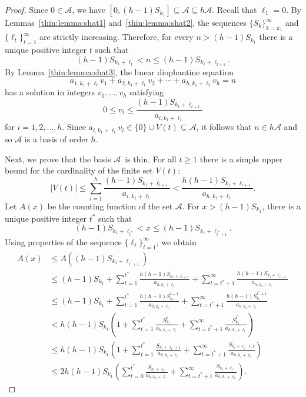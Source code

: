 \documentclass{amsart}
\begin{document}
\begin{proof}
Since $0 \in {\ensuremath{ \mathcal A}}$, we have $[0,(h-1)S_{k_1}] \subseteq {\ensuremath{ \mathcal A}} \subseteq h{\ensuremath{ \mathcal A}}.$  Recall that $\ell_1 = 0$.  
By Lemmas~\ref{thin:lemma:shat1} and~\ref{thin:lemma:shat2}, the sequences 
$\{S_k\}_{k=k_1}^{\infty}$ and $\{\ell_t\}_{t=1}^{\infty}$ are strictly increasing.  Therefore, for every $n > (h-1)S_{k_1}$ there is a unique positive integer $t$ such that 
\[
(h-1)S_{{k_1}+ \ell_t} < n \leq (h-1)S_{{k_1}+ \ell_{t+1}}.
\]
By Lemma~\ref{thin:lemma:shat3}, the linear diophantine equation
\[
a_{1,{k_1}+ \ell_t} v_{1} + a_{2,{k_1}+ \ell_t} v_{2} + \cdots + a_{h,{k_1}+ \ell_t} v_{h} = n
\]
has a solution in integers $v_{1},\ldots, v_{h}$ satisfying 
\[
0 \leq v_{i} \leq \frac{(h-1)S_{{k_1}+ \ell_{t+1}}}{a_{i,{k_1}+ \ell_t}}
\]
for $i=1,2,\ldots, h.$  Since $a_{i,k_1+ \ell_t}v_{i} \in \{ 0 \} \cup V(t) \subseteq {\ensuremath{ \mathcal A}}$, it follows that  $n \in h{\ensuremath{ \mathcal A}}$ and so ${\ensuremath{ \mathcal A}}$ is a basis of order $h$.

Next, we prove that the basis {\ensuremath{ \mathcal A}}\ is thin.  
For all $t \geq 1$ there is a simple upper bound for the cardinality of the finite set $V(t)$:
\[
|V(t)| 
\leq \sum_{i=1}^h \frac{(h-1)S_{k_1+ \ell_{t+1}}}{a_{i,k_1+\ell_t}} 
< \frac{h(h-1)S_{k_1+ \ell_{t+1}}}{a_{h,k_1+\ell_t}}.
\]
Let $A(x)$ be the counting function of the set {\ensuremath{ \mathcal A}}.  
For $x > (h-1) S_{k_1}$, there is a unique positive integer $t^*$ such that 
\[
(h-1) S_{k_1+\ell_{t^*}} < x \leq (h-1) S_{k_1+\ell_{t^*+1}}.
\]
Using properties of the sequence $\{\ell_t\}_{t=1}^{\infty}$, we obtain 
\begin{align*}
A(x) & \leq A\left( (h-1) S_{k_1+\ell_{t^*+1} } \right)   \\
& \leq (h-1)S_{k_1} 
+  \sum_{t=1}^{t^*}  \frac{ h(h-1)S_{k_1+\ell_{t+1}}}{a_{h,{k_1}+\ell_t}} 
+  \sum_{t =t^*+1}^{\infty} \frac{h(h-1)S_{k_1+ \ell_{t^* +1}}}{a_{h,{k_1}+\ell_t }} \\
& \leq  (h-1)S_{k_1} 
+  \sum_{t=1}^{t^*} \frac{h(h-1)S_{k_1}^{t+1}}{a_{h,{k_1}+\ell_t}}  +  \sum_{t = t^*+1}^{\infty} \frac{h(h-1)S_{k_1}^{t^*+1}}{a_{h,{k_1}+\ell_t}}   \\
& <  h(h-1)S_{k_1} 
\left( 1 +  \sum_{t=1}^{t^*} \frac{S_{k_1}^{t}}{a_{h,{k_1}+\ell_t}}  
+  \sum_{t = t^*+1}^{\infty} \frac{S_{k_1}^{t^*}}{a_{h,{k_1}+\ell_t}} \right)  \\
& \leq  h(h-1)S_{k_1} 
\left( 1 +  \sum_{t=1}^{t^*} \frac{S_{k_1+ \ell_t +1}}{a_{h,{k_1}+\ell_t}}  
+  \sum_{t = t^*+1}^{\infty} \frac{S_{k_1+ \ell_{t^*}+1}}{a_{h,{k_1}+\ell_t}} \right) \\
& \leq  2h(h-1)S_{k_1} 
\left(\sum_{t=0}^{t^*} \frac{S_{k_1+ \ell_t }}{a_{h,{k_1}+\ell_t}}  
+  \sum_{t = t^*+1}^{\infty} \frac{S_{k_1+ \ell_{t^*}}}{a_{h,{k_1}+\ell_t}} \right).  
\end{align*}


\end{proof}
\end{document}
